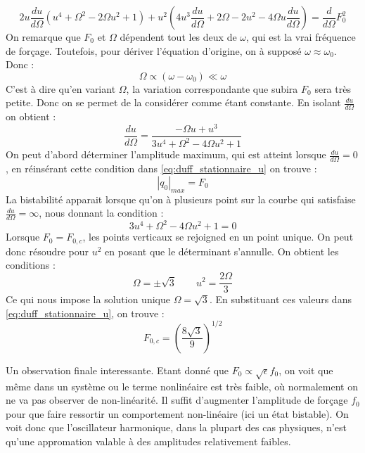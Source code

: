 \begin{equation}
    2u\frac{du}{d\Omega}(u^4 + \Omega^2 - 2\Omega u^2 + 1) + u^2(4u^3\frac{du}{d\Omega} + 2\Omega - 2u^2 - 4\Omega u\frac{du}{d\Omega}) = \frac{d}{d\Omega}F_0^2
\end{equation}
On remarque que $F_0$ et $\Omega$ dépendent tout les deux de $\omega$, qui est la vrai fréquence de forçage. Toutefois, pour dériver l'équation d'origine, on à supposé $\omega \approx \omega_0$. Donc : 
\begin{equation*}
    \Omega \propto (\omega - \omega_0) \ll \omega
\end{equation*}
C'est à dire qu'en variant $\Omega$, la variation correspondante que subira $F_0$ sera très petite. Donc on se permet de la considérer comme étant constante. En isolant $\frac{du}{d\Omega}$ on obtient :
\begin{equation}
    \frac{du}{d\Omega} = \frac{-\Omega u + u^3}{3u^4 + \Omega^2 - 4\Omega u^2 + 1}
\end{equation}
On peut d'abord déterminer l'amplitude maximum, qui est atteint lorsque $\frac{du}{d\Omega}=0$, en réinsérant cette condition dans \eqref{eq:duff_stationnaire_u} on trouve :
\begin{equation*}
    |q_0|_{max} = F_0
\end{equation*}
La bistabilité apparait lorsque qu'on à plusieurs point sur la courbe qui satisfaise $\frac{du}{d\Omega}=\infty$, nous donnant la condition :
\begin{equation}
    3u^4 + \Omega^2 - 4\Omega u^2 + 1 = 0
\end{equation}
Lorsque $F_0 = F_{0,c}$, les points verticaux se rejoigned en un point unique. On peut donc résoudre pour $u^2$ en posant que le déterminant s'annulle. On obtient les conditions :
\begin{equation}
    \Omega = \pm \sqrt{3}
    \qquad
    u^2 = \frac{2\Omega}{3}
\end{equation}
Ce qui nous impose la solution unique $\Omega = \sqrt{3}$. En substituant ces valeurs dans \eqref{eq:duff_stationnaire_u}, on trouve :
\begin{equation}
    F_{0,c} = \left(  \frac{8\sqrt{3}}{9}  \right)^{1/2}
\end{equation}

Un observation finale interessante. Etant donné que $F_0 \propto \sqrt{\epsilon}f_0$, 
on voit que même dans un système ou le terme nonlinéaire est très faible, où normalement 
on ne va pas observer de non-linéarité. Il suffit d'augmenter l'amplitude de forçage $f_0$ 
pour que faire ressortir un comportement non-linéaire (ici un état bistable). On voit donc que l'oscillateur harmonique, 
dans la plupart des cas physiques, n'est qu'une appromation valable à des amplitudes relativement faibles.
